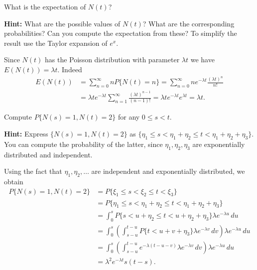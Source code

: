 \begin{Exercise}
\label{ex:poisson-expectation}
What is the expectation of $N(t)$?

\noindent\textbf{Hint:} What are the possible values of $N(t)$? What are the corresponding probabilities? Can you compute the expectation from these? To simplify the result use the Taylor expansion of $e^x$.
\end{Exercise}

\begin{Solution}
Since $N(t)$ has the Poisson distribution with parameter $\lambda t$ we have $E(N(t)) = \lambda t$. Indeed
\begin{equation}
\begin{aligned}
E(N(t)) &= \sum_{n=0}^{\infty} n P\{N(t) = n\} = \sum_{n=0}^{\infty} n e^{-\lambda t} \frac{(\lambda t)^n}{n!} \\
&= \lambda t e^{-\lambda t} \sum_{n=1}^{\infty} \frac{(\lambda t)^{n-1}}{(n-1)!} = \lambda t e^{-\lambda t} e^{\lambda t} = \lambda t.
\end{aligned}
\end{equation}
\end{Solution}

\begin{Exercise}
\label{ex:poisson-joint-probability}
Compute $P\{N(s) = 1, N(t) = 2\}$ for any $0 \leq s < t$.

\noindent\textbf{Hint:} Express $\{N(s) = 1, N(t) = 2\}$ as $\{\eta_1 \leq s < \eta_1 + \eta_2 \leq t < \eta_1 + \eta_2 + \eta_3\}$. You can compute the probability of the latter, since $\eta_1, \eta_2, \eta_3$ are exponentially distributed and independent.
\end{Exercise}

\begin{Solution}
Using the fact that $\eta_1, \eta_2, \ldots$ are independent and exponentially distributed, we obtain
\begin{equation}
\begin{aligned}
P\{N(s) = 1, N(t) = 2\} &= P\{\xi_1 \leq s < \xi_2 \leq t < \xi_3\} \\
&= P\{\eta_1 \leq s < \eta_1 + \eta_2 \leq t < \eta_1 + \eta_2 + \eta_3\} \\
&= \int_0^s P\{s < u + \eta_2 \leq t < u + \eta_2 + \eta_3\} \lambda e^{-\lambda u} \, du \\
&= \int_0^s \left(\int_{s-u}^{t-u} P\{t < u + v + \eta_3\} \lambda e^{-\lambda v} \, dv\right) \lambda e^{-\lambda u} \, du \\
&= \int_0^s \left(\int_{s-u}^{t-u} e^{-\lambda(t-u-v)} \lambda e^{-\lambda v} \, dv\right) \lambda e^{-\lambda u} \, du \\
&= \lambda^2 e^{-\lambda t} s (t - s).
\end{aligned}
\end{equation}
\end{Solution}

